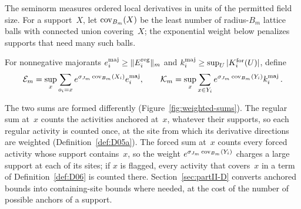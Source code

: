 The seminorm measures ordered local derivatives in units of the permitted field size. For a support~$X$, let $\operatorname{cov}_{B_m}(X)$ be the least number of radius-$B_m$ lattice balls with connected union covering~$X$; the exponential weight below penalizes supports that need many such balls.

\begin{definition}\label{def:D05b}
For nonnegative majorants $e_i^{\rm maj}\ge\|E_i^{\rm reg}\|_m$ and $k_i^{\rm maj}\ge\sup_U|K_i^{\rm for}(U)|$, define
\begin{equation*}
\mathcal E_m=\sup_x\sum_{o_i=x}e^{\sigma_{J_m}\operatorname{cov}_{B_m}(X_i)}e_i^{\rm maj},\qquad
\mathcal K_m=\sup_x\sum_{x\in Y_i}e^{\sigma_{J_m}\operatorname{cov}_{B_m}(Y_i)}k_i^{\rm maj}\,.
\end{equation*}
\end{definition}

The two sums are formed differently (Figure~\ref{fig:weighted-sums}). The regular sum at~$x$ counts the activities anchored at~$x$, whatever their supports, so each regular activity is counted once, at the site from which its derivative directions are weighted (Definition~\ref{def:D05a}). The forced sum at~$x$ counts every forced activity whose support contains~$x$, so the weight $e^{\sigma_{J_m}\operatorname{cov}_{B_m}(Y_i)}$ charges a large support at each of its sites; if $x$ is flagged, every activity that covers~$x$ in a term of Definition~\ref{def:D06} is counted there. Section~\ref{sec:partII-D} converts anchored bounds into containing-site bounds where needed, at the cost of the number of possible anchors of a support.


